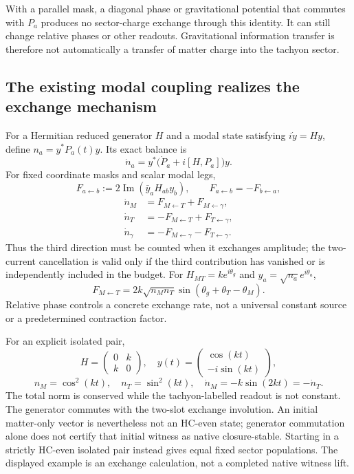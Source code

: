 \documentclass[11pt,a4paper]{article}
\begin{document}
With a parallel mask, a diagonal phase or gravitational potential that
commutes with $P_a$ produces no sector-charge exchange through this
identity. It can still change relative phases or other readouts.
Gravitational information transfer is therefore not automatically a
transfer of matter charge into the tachyon sector.

\subsection{The existing modal coupling realizes the exchange mechanism}
For a Hermitian reduced generator $H$ and a modal state satisfying
$i\dot y=Hy$, define $n_a=y^*P_a(t)y$. Its exact balance is
\[
 \dot n_a=y^*\bigl(\dot P_a+i[H,P_a]\bigr)y.
\]
For fixed coordinate masks and scalar modal legs,
\[
 F_{a\leftarrow b}:=2\operatorname{Im}(\bar y_aH_{ab}y_b),
 \qquad F_{a\leftarrow b}=-F_{b\leftarrow a},
\]
\[
 \begin{aligned}
 \dot n_M&=F_{M\leftarrow T}+F_{M\leftarrow\gamma},\\
 \dot n_T&=-F_{M\leftarrow T}+F_{T\leftarrow\gamma},\\
 \dot n_\gamma&=-F_{M\leftarrow\gamma}-F_{T\leftarrow\gamma}.
 \end{aligned}
\]
Thus the third direction must be counted when it exchanges amplitude;
the two-current cancellation is valid only if the third contribution
has vanished or is independently included in the budget. For
$H_{MT}=k e^{i\theta_g}$ and
$y_a=\sqrt{n_a}e^{i\theta_a}$,
\[
 F_{M\leftarrow T}
 =2k\sqrt{n_Mn_T}\sin(\theta_g+\theta_T-\theta_M).
\]
Relative phase controls a concrete exchange rate, not a universal
constant source or a predetermined contraction factor.

For an explicit isolated pair,
\[
 H=\begin{pmatrix}0&k\\k&0\end{pmatrix},\quad
 y(t)=\begin{pmatrix}\cos(kt)\\-i\sin(kt)\end{pmatrix},
\]
\[
 n_M=\cos^2(kt),\quad n_T=\sin^2(kt),\quad
 \dot n_M=-k\sin(2kt)=-\dot n_T.
\]
The total norm is conserved while the tachyon-labelled readout is not
constant. The generator commutes with the two-slot exchange involution.
An initial matter-only vector is nevertheless not an HC-even state;
generator commutation alone does not certify that initial witness as
native closure-stable. Starting in a strictly HC-even isolated pair
instead gives equal fixed sector populations. The displayed example
is an exchange calculation, not a completed native witness lift.
\end{document}
